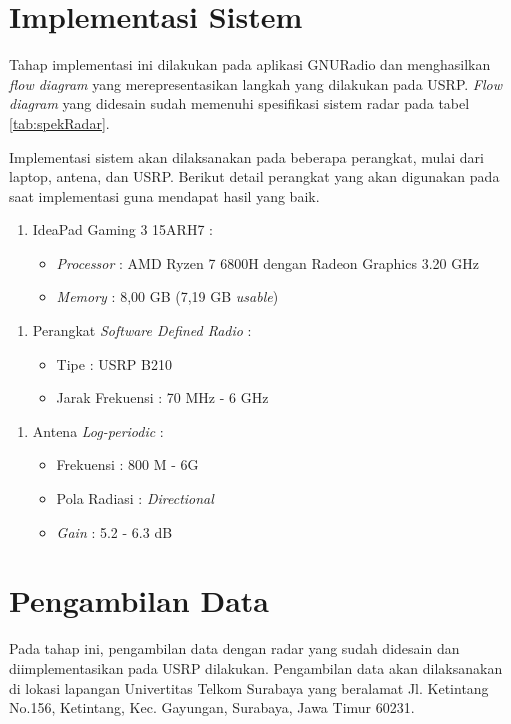 \section{Implementasi Sistem}
Tahap implementasi ini dilakukan pada aplikasi GNURadio dan menghasilkan \textit{flow diagram} yang merepresentasikan langkah yang dilakukan pada USRP. \textit{Flow diagram} yang didesain sudah memenuhi spesifikasi sistem radar pada tabel \ref{tab:spekRadar}. 

Implementasi sistem akan dilaksanakan pada beberapa perangkat, mulai dari laptop, antena, dan USRP. Berikut detail perangkat yang akan digunakan pada saat implementasi guna mendapat hasil yang baik.

\begin{enumerate}
	\item IdeaPad Gaming 3 15ARH7 :
	\begin{itemize}
		\item \textit{Processor} : AMD Ryzen 7 6800H dengan Radeon Graphics 3.20 GHz
		\item \textit{Memory} : 8,00 GB (7,19 GB \textit{usable})
	\end{itemize}
\end{enumerate}

\begin{enumerate}
	\item Perangkat \textit{Software Defined Radio} :
	\begin{itemize}
		\item Tipe : USRP B210 
		\item Jarak Frekuensi : 70 MHz - 6 GHz 
	\end{itemize}
\end{enumerate}

\begin{enumerate}
	\item Antena \textit{Log-periodic} :
	\begin{itemize}
		\item Frekuensi : 800 M - 6G 
		\item Pola Radiasi : \textit{Directional}
		\item \textit{Gain} : 5.2 - 6.3 dB
	\end{itemize}
\end{enumerate}

	
\section{Pengambilan Data}
Pada tahap ini, pengambilan data dengan radar yang sudah didesain dan diimplementasikan pada USRP dilakukan. Pengambilan data akan dilaksanakan di lokasi lapangan Univertitas Telkom Surabaya yang beralamat Jl. Ketintang No.156, Ketintang, Kec. Gayungan, Surabaya, Jawa Timur 60231.

